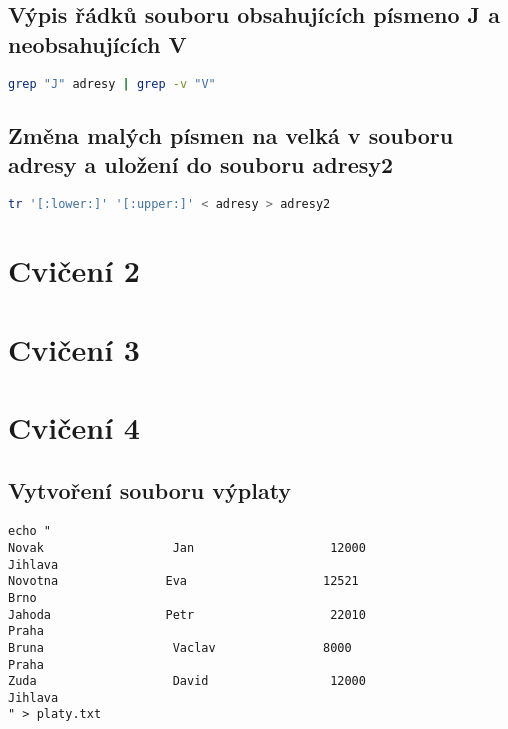 \documentclass{article}
\begin{document}
\subsection{Výpis řádků souboru obsahujících písmeno \textbf{J} a neobsahujících \textbf{V}}
\begin{lstlisting}[language=bash]
grep "J" adresy | grep -v "V"
\end{lstlisting}
\subsection{Změna malých písmen na velká v souboru adresy a uložení do souboru adresy2}
\begin{lstlisting}[language=bash]
tr '[:lower:]' '[:upper:]' < adresy > adresy2
\end{lstlisting}
\section{Cvičení 2}






\section{Cvičení 3}





\section{Cvičení 4}
\subsection{Vytvoření souboru výplaty}

\begin{lstlisting}
echo "
Novak                  Jan                   12000                    Jihlava         
Novotna               Eva                   12521                    Brno           
Jahoda                Petr                   22010                    Praha         
Bruna                  Vaclav               8000                      Praha        
Zuda                   David                 12000                    Jihlava
" > platy.txt
\end{lstlisting}
\end{document}
